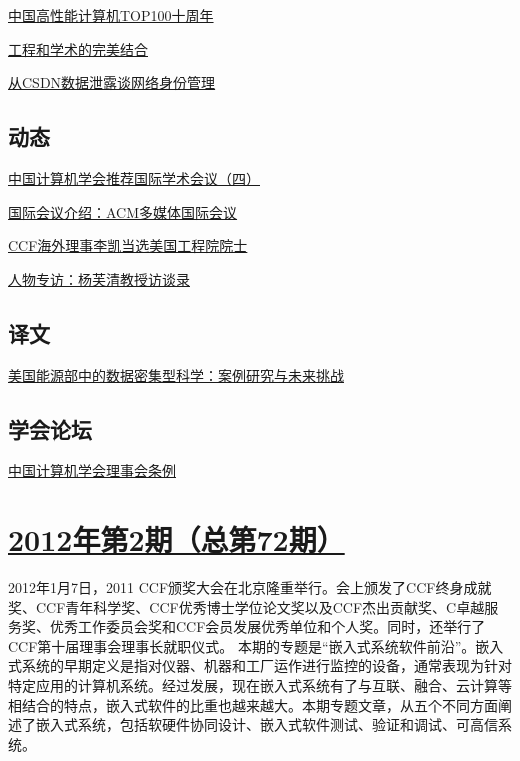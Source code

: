 \documentclass[a4paper]{article}
\begin{document}
\href{http://history.ccf.org.cn/resources/1190201776262/2012/03/16/8.pdf}{中国高性能计算机TOP100十周年}

\href{http://history.ccf.org.cn/resources/1190201776262/2012/03/16/7.pdf}{工程和学术的完美结合}

\href{http://history.ccf.org.cn/resources/1190201776262/2012/03/16/6.pdf}{从CSDN数据泄露谈网络身份管理}

\subsection{动态}
\href{http://history.ccf.org.cn/resources/1190201776262/2012/03/16/12.pdf}{中国计算机学会推荐国际学术会议（四）}

\href{http://history.ccf.org.cn/resources/1190201776262/2012/03/16/11.pdf}{国际会议介绍：ACM多媒体国际会议}

\href{http://history.ccf.org.cn/resources/1190201776262/2012/03/16/15.pdf}{CCF海外理事李凯当选美国工程院院士}

\href{http://history.ccf.org.cn/resources/1190201776262/2012/03/16/10.pdf}{人物专访：杨芙清教授访谈录}

\subsection{译文}
\href{http://history.ccf.org.cn/resources/1190201776262/2012/03/16/13.pdf}{美国能源部中的数据密集型科学：案例研究与未来挑战}

\subsection{学会论坛}
\href{http://history.ccf.org.cn/resources/1190201776262/2012/03/16/14.pdf}{中国计算机学会理事会条例}


\section{\href{http://history.ccf.org.cn/sites/ccf/jsjtbbd.jsp?contentId=2658329348582}{\textbf{2012年第2期（总第72期）}}}
2012年1月7日，2011 CCF颁奖大会在北京隆重举行。会上颁发了CCF终身成就奖、CCF青年科学奖、CCF优秀博士学位论文奖以及CCF杰出贡献奖、C卓越服务奖、优秀工作委员会奖和CCF会员发展优秀单位和个人奖。同时，还举行了CCF第十届理事会理事长就职仪式。
本期的专题是“嵌入式系统软件前沿”。嵌入式系统的早期定义是指对仪器、机器和工厂运作进行监控的设备，通常表现为针对特定应用的计算机系统。经过发展，现在嵌入式系统有了与互联、融合、云计算等相结合的特点，嵌入式软件的比重也越来越大。本期专题文章，从五个不同方面阐述了嵌入式系统，包括软硬件协同设计、嵌入式软件测试、验证和调试、可高信系统。
\end{document}
